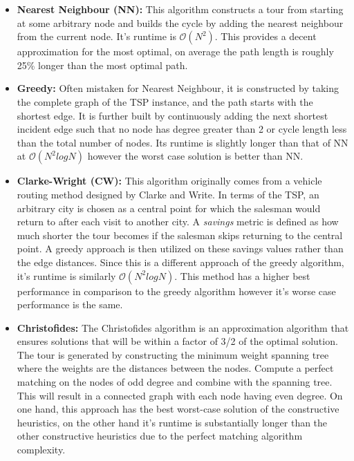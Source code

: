 \documentclass[]{UCD_CS_FYP_Report}
\begin{document}
\begin{itemize}
  \item \textbf{Nearest Neighbour (NN): }This algorithm constructs a tour from starting at some arbitrary node and builds the cycle by adding the nearest neighbour from the current node. It's runtime is $\mathcal{O}(N^2)$. This provides a decent approximation for the most optimal, on average the path length is roughly 25\% longer than the most optimal path.
  \item \textbf{Greedy: }Often mistaken for Nearest Neighbour, it is constructed by taking the complete graph of the TSP instance, and the path starts with the shortest edge. It is further built by continuously adding the next shortest incident edge such that no node has degree greater than 2 or cycle length less than the total number of nodes. Its runtime is slightly longer than that of NN at $\mathcal{O}(N^2logN)$ however the worst case solution is better than NN.
  \item \textbf{Clarke-Wright (CW): }This algorithm originally comes from a vehicle routing method designed by Clarke and Write\cite{Clarke:1964:SVC:2769344.2769349}. In terms of the TSP, an arbitrary city is chosen as a central point for which the salesman would return to after each visit to another city. A \textit{savings} metric is defined as how much shorter the tour becomes if the salesman skips returning to the central point. A greedy approach is then utilized on these savings values rather than the edge distances. Since this is a different approach of the greedy algorithm, it's runtime is similarly $\mathcal{O}(N^2logN)$. This method has a higher best performance in comparison to the greedy algorithm however it's worse case performance is the same.
  \item \textbf{Christofides: }The Christofides algorithm is an approximation algorithm that ensures solutions that will be within a factor of 3/2 of the optimal solution. The tour is generated by constructing the minimum weight spanning tree where the weights are the distances between the nodes. Compute a perfect matching on the nodes of odd degree and combine with the spanning tree. This will result in a connected graph with each node having even degree. On one hand, this approach has the best worst-case solution of the constructive heuristics, on the other hand it's runtime is substantially longer than the other constructive heuristics due to the perfect matching algorithm complexity.
\end{itemize}
\end{document}
